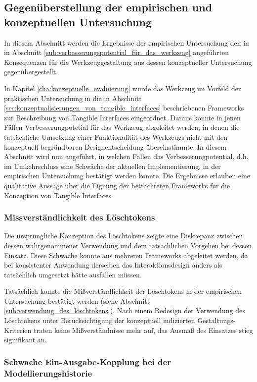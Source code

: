 \subsection{Gegenüberstellung der empirischen und konzeptuellen Untersuchung}
\label{sub:gegenüberstellung}

In diesem Abschnitt werden die Ergebnisse der empirischen Untersuchung den in in Abschnitt \ref{sub:verbesserungspotential_für_das_werkzeug} angeführten Konsequenzen für die Werkzeuggestaltung aus dessen konzeptueller Untersuchung gegenübergestellt.

In Kapitel \ref{cha:konzeptuelle_evaluierung} wurde das Werkzeug im Vorfeld der praktischen Untersuchung in die in Abschnitt \ref{sec:konzeptualisierungen_von_tangible_interfaces} beschriebenen Frameworks zur Beschreibung von Tangible Interfaces eingeordnet. Daraus konnte in jenen Fällen Verbesserungpotetial für das Werkzeug abgeleitet werden, in denen die tatsächliche Umsetzung einer Funktionalität des Werkzeugs nicht mit den konzeptuell begründbaren Designentscheidung übereinstimmte. In diesem Abschnitt wird nun angeführt, in welchen Fällen das Verbesserungpotential, d.h. im Umkehrschluss eine Schwäche der aktuellen Implementierung, in der empirischen Untersuchung bestätigt werden konnte. Die Ergebnisse erlauben eine qualitative Aussage über die Eignung der betrachteten Frameworks für die Konzeption von Tangible Interfaces.

\subsubsection{Missverständlichkeit des Löschtokens}

Die ursprüngliche Konzeption des Löschtokens zeigte eine Diskrepanz zwischen dessen wahrgenommener Verwendung und dem tatsächlichen Vorgehen bei dessen Einsatz. Diese Schwäche konnte aus mehreren Frameworks abgeleitet werden, da bei konsistenter Anwendung derselben das Interaktionsdesign anders als tatsächlich umgesetzt hätte ausfallen müssen.

Tatsächlich konnte die Mißverständlichkeit der Löschtokens in der empirischen Untersuchung bestätigt werden (siehe Abschnitt \ref{sub:verwendung_des_löschtokens}). Nach einem Redesign der Verwendung des Löschtokens unter Berücksichtigung der konzeptuell indizierten Gestaltungs-Kriterien traten keine Mißverständnisse mehr auf, das Ausmaß des Einsatzes stieg signifikant an.


\subsubsection{Schwache Ein-Ausgabe-Kopplung bei der Modellierungshistorie}

